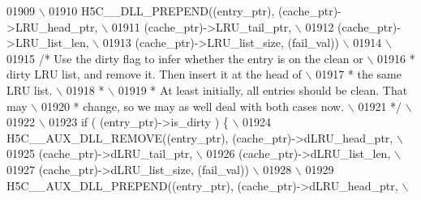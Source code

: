 \begin{DoxyCode}
01909 \textcolor{preprocessor}{                                                                            \(\backslash\)}
01910 \textcolor{preprocessor}{        H5C\_\_DLL\_PREPEND((entry\_ptr), (cache\_ptr)->LRU\_head\_ptr,            \(\backslash\)}
01911 \textcolor{preprocessor}{                         (cache\_ptr)->LRU\_tail\_ptr,                         \(\backslash\)}
01912 \textcolor{preprocessor}{             (cache\_ptr)->LRU\_list\_len,                         \(\backslash\)}
01913 \textcolor{preprocessor}{                         (cache\_ptr)->LRU\_list\_size, (fail\_val))            \(\backslash\)}
01914 \textcolor{preprocessor}{                                                                            \(\backslash\)}
01915 \textcolor{preprocessor}{        }\textcolor{comment}{/* Use the dirty flag to infer whether the entry is on the clean or \(\backslash\)}
01916 \textcolor{comment}{         * dirty LRU list, and remove it.  Then insert it at the head of    \(\backslash\)}
01917 \textcolor{comment}{         * the same LRU list.                                               \(\backslash\)}
01918 \textcolor{comment}{         *                                                                  \(\backslash\)}
01919 \textcolor{comment}{         * At least initially, all entries should be clean.  That may       \(\backslash\)}
01920 \textcolor{comment}{         * change, so we may as well deal with both cases now.              \(\backslash\)}
01921 \textcolor{comment}{         */}\textcolor{preprocessor}{                                                                 \(\backslash\)}
01922 \textcolor{preprocessor}{                                                                            \(\backslash\)}
01923 \textcolor{preprocessor}{        if ( (entry\_ptr)->is\_dirty ) \{                                      \(\backslash\)}
01924 \textcolor{preprocessor}{            H5C\_\_AUX\_DLL\_REMOVE((entry\_ptr), (cache\_ptr)->dLRU\_head\_ptr,    \(\backslash\)}
01925 \textcolor{preprocessor}{                                (cache\_ptr)->dLRU\_tail\_ptr,                 \(\backslash\)}
01926 \textcolor{preprocessor}{                                (cache\_ptr)->dLRU\_list\_len,                 \(\backslash\)}
01927 \textcolor{preprocessor}{                                (cache\_ptr)->dLRU\_list\_size, (fail\_val))    \(\backslash\)}
01928 \textcolor{preprocessor}{                                                                            \(\backslash\)}
01929 \textcolor{preprocessor}{            H5C\_\_AUX\_DLL\_PREPEND((entry\_ptr), (cache\_ptr)->dLRU\_head\_ptr,   \(\backslash\)}

\end{DoxyCode}
